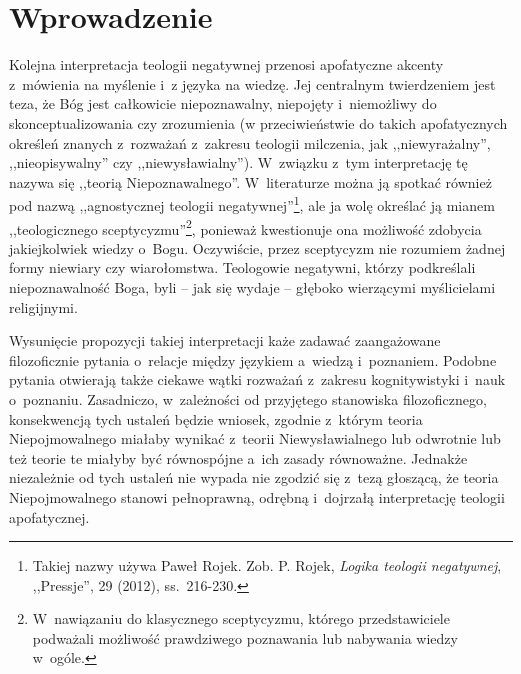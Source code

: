 


\chapter{Wprowadzenie}


Kolejna interpretacja teologii negatywnej przenosi apofatyczne akcenty z~mówienia na myślenie i~z języka na wiedzę. Jej centralnym twierdzeniem jest teza, że Bóg jest całkowicie niepoznawalny, niepojęty i~niemożliwy do skonceptualizowania czy zrozumienia (w przeciwieństwie do takich apofatycznych określeń znanych z~rozważań z~zakresu teologii milczenia, jak ,,niewyrażalny'', ,,nieopisywalny'' czy ,,niewysławialny''). W~związku z~tym interpretację tę nazywa się ,,teorią Niepoznawalnego''. W~literaturze można ją spotkać również pod nazwą ,,agnostycznej teologii negatywnej''\footnote{Takiej nazwy używa Paweł Rojek. Zob. P. Rojek, \textit{Logika teologii negatywnej}, ,,Pressje'', 29 (2012), ss.~216-230.}, ale ja wolę określać ją mianem ,,teologicznego sceptycyzmu''\footnote{W~nawiązaniu do klasycznego sceptycyzmu, którego przedstawiciele podważali możliwość prawdziwego poznawania lub nabywania wiedzy w~ogóle.}, ponieważ kwestionuje ona możliwość zdobycia jakiejkolwiek wiedzy o~Bogu. Oczywiście, przez sceptycyzm nie rozumiem żadnej formy niewiary czy wiarołomstwa. Teologowie negatywni, którzy podkreślali niepoznawalność Boga, byli -- jak się wydaje -- głęboko wierzącymi myślicielami religijnymi.

Wysunięcie propozycji takiej interpretacji każe zadawać zaangażowane filozoficznie pytania o~relacje między językiem a~wiedzą i~poznaniem. Podobne pytania otwierają także ciekawe wątki rozważań z~zakresu kognitywistyki i~nauk o~poznaniu. Zasadniczo, w~zależności od przyjętego stanowiska filozoficznego, konsekwencją tych ustaleń będzie wniosek, zgodnie z~którym teoria Niepojmowalnego miałaby wynikać z~teorii Niewysławialnego lub odwrotnie lub też teorie te miałyby być równospójne a~ich zasady równoważne. Jednakże niezależnie od tych ustaleń nie wypada nie zgodzić się z~tezą głoszącą, że teoria Niepojmowalnego stanowi pełnoprawną, odrębną i~dojrzałą interpretację teologii apofatycznej.

